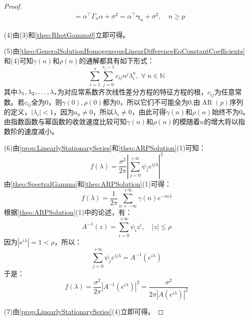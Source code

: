 \begin{proof}
\begin{align*}
		&=\alpha^{\top}\Gamma_n\alpha+\sigma^2=\alpha^{\top}\boldsymbol{\gamma}_n+\sigma^2,\quad n\geqslant p
	\end{align*}\par
	(4)由(3)和\cref{theo:RhotGamma0}立即可得。\par
	(5)由\cref{theo:GeneralSolutionHomogeneousLinearDifferenceEqConstantCoefficients}和(4)可知$\gamma(n)$和$\rho(n)$的通解都具有如下形式：
	\begin{equation*}
		\sum_{i=1}^{s}\sum_{j=0}^{r_i-1}c_{ij}n^{j}\lambda_i^n,\;\forall\;n\in\mathbb{N}
	\end{equation*}
	其中$\lambda_1, \lambda_2, \dots, \lambda_{s}$为对应常系数齐次线性差分方程的特征方程的根，$c_{ij}$为任意常数。若$c_{ij}$全为$0$，则$\gamma(0),\rho(0)$都为$0$，所以它们不可能全为$0$.由$\operatorname{AR}(p)$序列的定义，$|\lambda_i|<1$，因为$a_p\ne0$，所以$\lambda_i\ne0$，由此可得$\gamma(n)$和$\rho(n)$始终不为$0$。由指数函数与幂函数的收敛速度比较可知$\gamma(n)$和$\rho(n)$的模随着$n$的增大将以指数阶的速度减小。\par
	(6)由\cref{prop:LinearlyStationarySeries}和\cref{theo:ARPSolution}(1)可知：
	\begin{equation*}
		f(\lambda)=\frac{\sigma^2}{2\pi}\left|\sum_{j=0}^{+\infty}\psi_je^{ij\lambda}\right|^2
	\end{equation*}
	由\cref{theo:SpectralGamma}和\cref{theo:ARPSolution}(1)可得：
	\begin{equation*}
		f(\lambda)=\frac{1}{2\pi}\sum_{n=-\infty}^{+\infty}\gamma(n)e^{-in\lambda}
	\end{equation*}
	根据\cref{theo:ARPSolution}(1)中的论述，有：
	\begin{equation*}
		A^{-1}(z)=\sum_{i=0}^{+\infty}\psi_iz^i,\quad|z|\leqslant\rho
	\end{equation*}
	因为$|e^{i\lambda}|=1<\rho$，所以：
	\begin{equation*}
		\sum_{j=0}^{+\infty}\psi_je^{ij\lambda}=A^{-1}(e^{i\lambda})
	\end{equation*}
	于是：
	\begin{equation*}
		f(\lambda)=\frac{\sigma^2}{2\pi}\left|A^{-1}(e^{i\lambda})\right|^2=\frac{\sigma^2}{2\pi|A(e^{i\lambda})|^2}
	\end{equation*}\par
	(7)由\cref{prop:LinearlyStationarySeries}(4)立即可得。
\end{proof}

